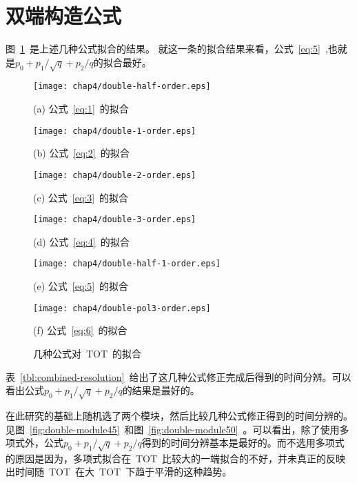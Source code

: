 \section{双端构造公式}

图~\ref{fig:single-formula}~是上述几种公式拟合的结果。
就这一条的拟合结果来看，公式~\ref{eq:5}~,也就是${p_{0}+p_{1}/\sqrt{q}+p_{2}/q}$的拟合最好。

\begin{figure}[!h]
\begin{minipage}{0.5\linewidth}
  \centerline{\texttt{[image: chap4/double-half-order.eps]}}
  \centerline{(a) 公式~\ref{eq:1}~的拟合}
  \centerline{\label{fig:double-half-order}}
\end{minipage}
\hfill
\begin{minipage}{0.5\linewidth}
  \centerline{\texttt{[image: chap4/double-1-order.eps]}}
  \centerline{(b) 公式~\ref{eq:2}~的拟合}
  \centerline{\label{fig:double-1-order}}
\end{minipage}
\vfill
\begin{minipage}{0.5\linewidth}
  \centerline{\texttt{[image: chap4/double-2-order.eps]}}
  \centerline{(c) 公式~\ref{eq:3}~的拟合}
  \centerline{\label{fig:double-2-order}}
\end{minipage}
\hfill
\begin{minipage}{0.5\linewidth}
  \centerline{\texttt{[image: chap4/double-3-order.eps]}}
  \centerline{(d) 公式~\ref{eq:4}~的拟合}
  \centerline{\label{fig:double-3-order}}
\end{minipage}
\vfill
\begin{minipage}{0.5\linewidth}
  \centerline{\texttt{[image: chap4/double-half-1-order.eps]}}
  \centerline{(e) 公式~\ref{eq:5}~的拟合}
  \centerline{\label{fig:double-half-1-order}}
\end{minipage}
\hfill
\begin{minipage}{0.5\linewidth}
  \centerline{\texttt{[image: chap4/double-pol3-order.eps]}}
  \centerline{(f) 公式~\ref{eq:6}~的拟合}
  \centerline{\label{fig:double-pol3-order}}
\end{minipage}
\caption{几种公式对~TOT~的拟合}
\label{fig:single-formula}
\end{figure}

表~\ref{tbl:combined-resolution}~给出了这几种公式修正完成后得到的时间分辨。可以看出公式${p_{0}+p_{1}/\sqrt{q}+p_{2}/q}$的结果是最好的。

在此研究的基础上随机选了两个模块，然后比较几种公式修正得到的时间分辨的。见图~\ref{fig:double-module45}~和图~\ref{fig:double-module50}~。可以看出，除了使用多项式外，公式${p_{0}+p_{1}/\sqrt{q}+p_{2}/q}$得到的时间分辨基本是最好的。而不选用多项式的原因是因为，多项式拟合在~TOT~比较大的一端拟合的不好，并未真正的反映出时间随~TOT~在大~TOT~下趋于平滑的这种趋势。

